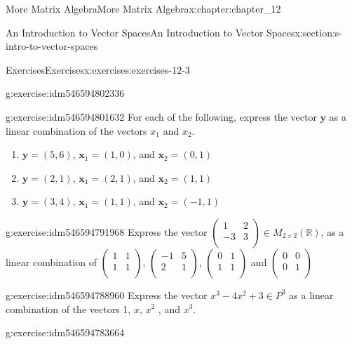 \documentclass[oneside,10pt,]{book}
\numberwithin{equation}{section}
\renewcommand{\vec}[1]{\mathbf{#1}}
\begin{document}
\begin{chapterptx}{More Matrix Algebra}{}{More Matrix Algebra}{}{}{x:chapter:chapter_12}
\begin{sectionptx}{An Introduction to Vector Spaces}{}{An Introduction to Vector Spaces}{}{}{x:section:s-intro-to-vector-spaces}
\begin{exercises-subsection}{Exercises}{}{Exercises}{}{}{x:exercises:exercises-12-3}
\begin{divisionexercise}{5}{}{}{g:exercise:idm546594802336}
\end{divisionexercise}%
\begin{divisionexercise}{6}{}{}{g:exercise:idm546594801632}%
For each of the following, express the vector \(\pmb{y}\) as a linear combination of the vectors \(x_1\) and \(x_2\).%
\begin{enumerate}[label=(\alph*)]
\item{}\(\vec{y} = (5, 6)\),  \(\vec{x}_1 =(1, 0)\), and \(\vec{x}_2 = (0, 1)\)%
\item{}\(\vec{y} = (2, 1)\),  \(\vec{x}_1 =(2, 1)\), and  \(\vec{x}_2 = (1, 1)\)%
\item{}\(\vec{y} = (3,4)\),   \(\vec{x}_1 = (1, 1)\), and  \(\vec{x}_2 = (-1, 1)\)%
\end{enumerate}
%
\end{divisionexercise}%
\begin{divisionexercise}{7}{}{}{g:exercise:idm546594791968}%
Express the vector  \(\left(
\begin{array}{cc}
1 & 2 \\
-3 & 3 \\
\end{array}
\right)\in M_{2\times 2}(\mathbb{R})\), as a linear combination of \(\left(
\begin{array}{cc}
1 & 1 \\
1 & 1 \\
\end{array}
\right)\),   \(\left(
\begin{array}{cc}
-1 & 5 \\
2 & 1 \\
\end{array}
\right)\),  \(\left(
\begin{array}{cc}
0 & 1 \\
1 & 1 \\
\end{array}
\right)\)  and \(\left(
\begin{array}{cc}
0 & 0 \\
0 & 1 \\
\end{array}
\right)\)%
\end{divisionexercise}%
\begin{divisionexercise}{8}{}{}{g:exercise:idm546594788960}%
Express the vector \(x^3-4x^2+3\in P^3\) as a linear combination of the vectors 1, \(x\), \(x^2\) , and \(x^3\).%
\end{divisionexercise}%
\begin{divisionexercise}{9}{}{}{g:exercise:idm546594783664}%

\end{divisionexercise}
\end{exercises-subsection}
\end{sectionptx}
\end{chapterptx}
\end{document}
